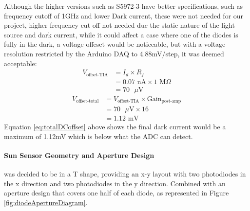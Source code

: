 Although the higher versions such as S5972-3 have better specifications, such as frequency cutoff of 1GHz and lower Dark current, these were not needed for our project, higher frequency cut off not needed due the static nature of the light source and dark current, while it could affect a case where one of the diodes is fully in the dark, a voltage offeset would be noticeable, but with a voltage resolution restricted by the Arduino DAQ to 4.88mV/step, it was deemed acceptable:
\begin{equation} \label{eq:darkCurrentOffset}
  \begin{split}
V_\text{offset-TIA} &= I_d \times R_f \\
&= 0.07 \text{ nA} \times 1 \text{ M}\Omega \\
&= 70 \text{ }\mu\text{V}
  \end{split}
\end{equation}
\begin{equation} \label{eq:totalDCoffset}
  \begin{split}
V_\text{offset-total} &= V_\text{offset-TIA} \times \text{Gain}_\text{post-amp} \\
&= 70 \text{ }\mu\text{V} \times 16 \\
&= 1.12 \text{ mV}
  \end{split}
\end{equation}
Equation \ref{eq:totalDCoffset} above shows the final dark current would be a maximum of 1.12mV which is below what the ADC can detect. 

\paragraph{Sun Sensor Geometry and Aperture Design} was decided to be in a T shape, providing an x-y layout with two photodiodes in the x direction and two photodiodes in the y direction. Combined with an aperture design that covers one half of each diode, as represented in Figure \ref{fig:diodeApertureDiagram}.

